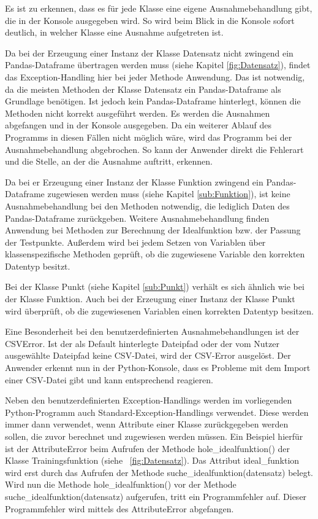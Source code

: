 \documentclass[
    a4paper, 								%
    oneside, 								%
    11pt, 									%
    listof=totoc, 					%
    bibliography=totoc, 		%
    final, 									%
    numbers=noenddot
]{scrreprt}
\newcommand{\abbildung}[1]{\figurename\ \ref{#1}}
\begin{document}
Es ist zu erkennen, dass es für jede Klasse eine eigene Ausnahmebehandlung gibt, die in der Konsole ausgegeben wird. So wird beim Blick in die Konsole sofort deutlich, in welcher Klasse eine Ausnahme aufgetreten ist.

Da bei der Erzeugung einer Instanz der Klasse Datensatz nicht zwingend ein Pandas-Dataframe übertragen werden muss (siehe Kapitel \ref{fig:Datensatz}), findet das Exception-Handling hier bei jeder Methode Anwendung. Das ist notwendig, da die meisten Methoden der Klasse Datensatz ein Pandas-Dataframe als Grundlage benötigen. Ist jedoch kein Pandas-Dataframe hinterlegt, können die Methoden nicht korrekt ausgeführt werden. Es werden die Ausnahmen abgefangen und in der Konsole ausgegeben. Da ein weiterer Ablauf des Programms in diesen Fällen nicht möglich wäre, wird das Programm bei der Ausnahmebehandlung abgebrochen. So kann der Anwender direkt die Fehlerart und die Stelle, an der die Ausnahme auftritt, erkennen.

Da bei er Erzeugung einer Instanz der Klasse Funktion zwingend ein Pandas-Dataframe zugewiesen werden muss (siehe Kapitel \ref{sub:Funktion}), ist keine Ausnahmebehandlung bei den Methoden notwendig, die lediglich Daten des Pandas-Dataframe zurückgeben. 
Weitere Ausnahmebehandlung finden Anwendung bei Methoden zur Berechnung der Idealfunktion bzw. der Passung der Testpunkte. Außerdem wird bei jedem Setzen von Variablen über klassenspezifische Methoden geprüft, ob die zugewiesene Variable den korrekten Datentyp besitzt.  

Bei der Klasse Punkt (siehe Kapitel \ref{sub:Punkt}) verhält es sich ähnlich wie bei der Klasse Funktion. Auch bei der Erzeugung einer Instanz der Klasse Punkt wird überprüft, ob die zugewiesenen Variablen einen korrekten Datentyp besitzen. 

Eine Besonderheit bei den benutzerdefinierten Ausnahmebehandlungen ist der CSVError. Ist der als Default hinterlegte Dateipfad oder der vom Nutzer ausgewählte Dateipfad keine CSV-Datei, wird der CSV-Error ausgelöst. Der Anwender erkennt nun in der Python-Konsole, dass es Probleme mit dem Import einer CSV-Datei gibt und kann entsprechend reagieren.

Neben den benutzerdefinierten Exception-Handlings werden im vorliegenden Python-Programm auch Standard-Exception-Handlings verwendet. Diese werden immer dann verwendet, wenn Attribute einer Klasse zurückgegeben werden sollen, die zuvor berechnet und zugewiesen werden müssen. Ein Beispiel hierfür ist der AttributeError beim Aufrufen der Methode hole\_idealfunktion() der Klasse Trainingsfunktion (siehe \abbildung{fig:Datensatz}). Das Attribut ideal\_funktion wird erst durch das Aufrufen der Methode suche\_idealfunktion(datensatz) belegt. Wird nun die Methode hole\_idealfunktion() vor der Methode suche\_idealfunktion(datensatz) aufgerufen, tritt ein Programmfehler auf. Dieser Programmfehler wird mittels des AttributeError abgefangen.
\end{document}

